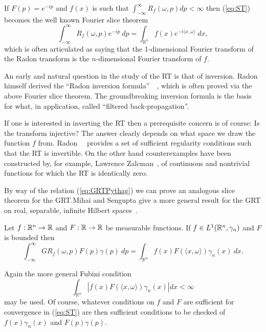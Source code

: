 If $F(p) = e^{-ip}$ and $f(x)$ is such that $\int_{-\infty}^\infty R_f(\omega, p) dp < \infty$ then (\ref{eq:ST}) becomes the well known Fourier slice theorem
\[
  \int_{-\infty}^\infty R_f(\omega, p) e^{-ip} ~dp
  = \int_{\mathbb{R}^n} f(x) e^{-i\langle x, \omega\rangle} ~dx,
\]
which is often articulated as saying that the $1$-dimensional Fourier transform of the Radon transform is the $n$-dimensional Fourier transform of $f$.

An early and natural question in the study of the RT is that of inversion. Radon himself derived the ``Radon inversion formula''~\cite{Rado17}~\cite{Rado86}, which is often proved via the above Fourier slice theorem. The groundbreaking inversion formula is the basis for what, in application, called ``filtered back-propagation''.

If one is interested in inverting the RT then a prerequisite concern is of course: Is the transform injective? The answer clearly depends on what space we draw the function $f$ from. Radon~\cite{Rado17}~\cite{Rado86} provides a set of sufficient regularity conditions such that the RT is invertible. On the other hand counterexamples have been constructed by, for example, Lawrence Zalcman~\cite{Zalc82}, of continuous and nontrivial functions for which the RT is identically zero.

By way of the relation (\ref{eq:GRTPythag}) we can prove an analogous slice theorem for the GRT.\@ Mihai and Sengupta give a more general result for the GRT on real, separable, infinite Hilbert spaces~\cite{Miha04}.

\begin{proposition} 
  Let $f:\mathbb{R}^n \rightarrow \mathbb{R}$ and $F:\mathbb{R} \rightarrow \mathbb{R}$ be measurable functions. If $f \in L^1(\mathbb{R}^n, \gamma_n)$ and $F$ is bounded then
  \begin{equation}\label{eq:GST}
    \int_{-\infty}^\infty GR_f(\omega, p)F(p) \gamma(p) ~dp
    = \int_{\mathbb{R}^n}f(x) F(\langle x, \omega\rangle) \gamma_n(x) ~dx. 
  \end{equation}
\end{proposition}

\begin{remark}
  Again the more general Fubini condition
  \[
    \int_{\mathbb{R}^n} |f(x) F(\langle x, \omega\rangle) \gamma_n(x)| dx < \infty
  \]
  may be used. Of course, whatever conditions on $f$ and $F$ are sufficient for convergence in (\ref{eq:ST}) are then sufficient conditions to be checked of $f(x)\gamma_n(x)$ and $F(p)\gamma(p)$.
\end{remark}




